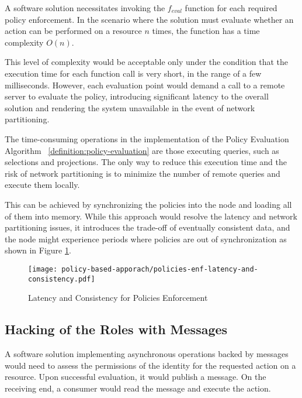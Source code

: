 A software solution necessitates invoking the $f_{eval}$ function for each required policy enforcement. 
In the scenario where the solution must evaluate whether an action can be performed on a resource $n$ times, the function has a time complexity $O(n)$.

\vspace{15pt}

This level of complexity would be acceptable only under the condition that the execution time for each function call is very short, in the range of a few milliseconds. 
However, each evaluation point would demand a call to a remote server to evaluate the policy, introducing significant latency to the overall solution and rendering the system unavailable in the event of network partitioning.


\vspace{15pt}

The time-consuming operations in the implementation of the Policy Evaluation Algorithm ~\ref{definition:policy-evaluation} are those executing queries, such as selections and projections. 
The only way to reduce this execution time and the risk of network partitioning is to minimize the number of remote queries and execute them locally. 

\vspace{15pt}

This can be achieved by synchronizing the policies into the node and loading all of them into memory. 
While this approach would resolve the latency and network partitioning issues, it introduces the trade-off of eventually consistent data, and the node might experience periods where policies are out of synchronization as shown in Figure \ref{fig:policies-enf-latency-and-consistency}.

\begin{figure}[h]
    \centering
    \texttt{[image: policy-based-apporach/policies-enf-latency-and-consistency.pdf]}
    \caption{Latency and Consistency for Policies Enforcement}
    \label{fig:policies-enf-latency-and-consistency}
\end{figure}

\subsection{Hacking of the Roles with Messages}
\label{sec:hacking-role-messages-solution}

A software solution implementing asynchronous operations backed by messages would need to assess the permissions of the identity for the requested action on a resource. 
Upon successful evaluation, it would publish a message. On the receiving end, a consumer would read the message and execute the action.

